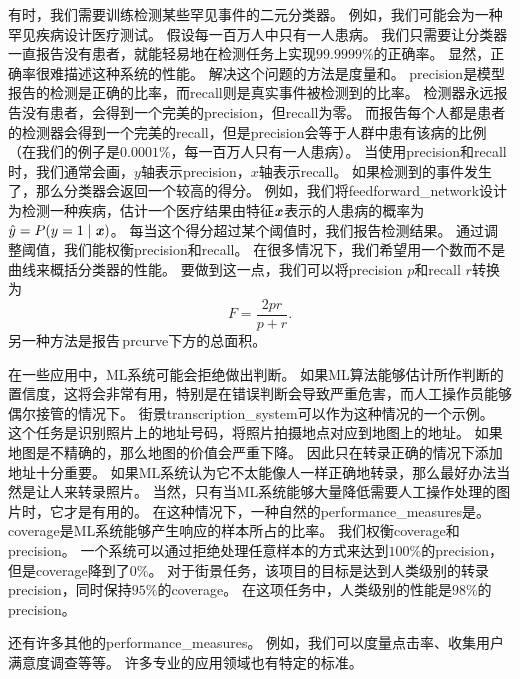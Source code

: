有时，我们需要训练检测某些罕见事件的二元分类器。
例如，我们可能会为一种罕见疾病设计医疗测试。
假设每一百万人中只有一人患病。
我们只需要让分类器一直报告没有患者，就能轻易地在检测任务上实现$99.9999\%$的正确率。
显然，正确率很难描述这种系统的性能。
解决这个问题的方法是度量和。
\gls{precision}是模型报告的检测是正确的比率，而\gls{recall}则是真实事件被检测到的比率。
检测器永远报告没有患者，会得到一个完美的\gls{precision}，但\gls{recall}为零。
而报告每个人都是患者的检测器会得到一个完美的\gls{recall}，但是\gls{precision}会等于人群中患有该病的比例（在我们的例子是$0.0001\%$，每一百万人只有一人患病）。
当使用\gls{precision}和\gls{recall}时，我们通常会画，$y$轴表示\gls{precision}，$x$轴表示\gls{recall}。
如果检测到的事件发生了，那么分类器会返回一个较高的得分。
例如，我们将\gls{feedforward_network}设计为检测一种疾病，估计一个医疗结果由特征$\boldsymbol{\mathit{x}}$表示的人患病的概率为$\hat{y} = P(y=1\mid\boldsymbol{\mathit{x}})$。
每当这个得分超过某个阈值时，我们报告检测结果。
通过调整阈值，我们能权衡\gls{precision}和\gls{recall}。
在很多情况下，我们希望用一个数而不是曲线来概括分类器的性能。
要做到这一点，我们可以将\gls{precision} $p$和\gls{recall} $r$转换为
\begin{equation}
	F = \frac{2pr}{p+r}.
\end{equation}
另一种方法是报告\,\gls{prcurve}下方的总面积。


在一些应用中，\gls{ML}系统可能会拒绝做出判断。
如果\gls{ML}算法能够估计所作判断的置信度，这将会非常有用，特别是在错误判断会导致严重危害，而人工操作员能够偶尔接管的情况下。
街景\gls{transcription_system}可以作为这种情况的一个示例。
这个任务是识别照片上的地址号码，将照片拍摄地点对应到地图上的地址。%
如果地图是不精确的，那么地图的价值会严重下降。
因此只在转录正确的情况下添加地址十分重要。
如果\gls{ML}系统认为它不太能像人一样正确地转录，那么最好办法当然是让人来转录照片。
当然，只有当\gls{ML}系统能够大量降低需要人工操作处理的图片时，它才是有用的。
在这种情况下，一种自然的\gls{performance_measures}是。
\gls{coverage}是\gls{ML}系统能够产生响应的样本所占的比率。
我们权衡\gls{coverage}和\gls{precision}。
一个系统可以通过拒绝处理任意样本的方式来达到$100\%$的\gls{precision}，但是\gls{coverage}降到了$0\%$。
对于街景任务，该项目的目标是达到人类级别的转录\gls{precision}，同时保持$95\%$的\gls{coverage}。
在这项任务中，人类级别的性能是$98\%$的\gls{precision}。

还有许多其他的\gls{performance_measures}。
例如，我们可以度量点击率、收集用户满意度调查等等。
许多专业的应用领域也有特定的标准。

